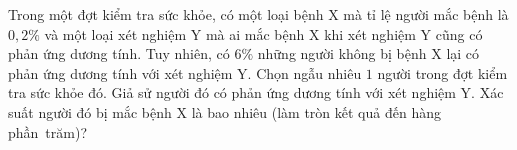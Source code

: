 
\begin{bt}%
	Trong một đợt kiểm tra sức khỏe, có một loại bệnh X mà tỉ lệ người mắc bệnh là $0{,}2\%$ và một loại xét nghiệm Y mà ai mắc bệnh X khi xét nghiệm Y cũng có phản ứng dương tính. Tuy nhiên, có $6\%$ những người không bị bệnh X lại có phản ứng dương tính với xét nghiệm Y. Chọn ngẫu nhiêu $1$ người trong đợt kiểm tra  sức khỏe đó. Giả sử người đó có phản ứng dương tính với xét nghiệm Y. Xác suất người đó bị mắc bệnh X là bao nhiêu (làm tròn kết quả đến hàng phần~trăm)?
\end{bt}

